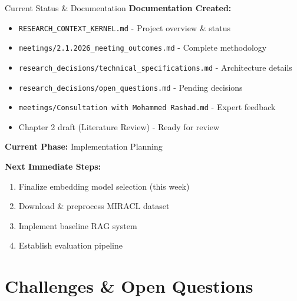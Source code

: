 \documentclass[aspectratio=169]{beamer}
\begin{document}
\begin{frame}{Current Status \& Documentation}
\textbf{Documentation Created:}
\begin{itemize}
    \item \texttt{RESEARCH\_CONTEXT\_KERNEL.md} - Project overview \& status
    \item \texttt{meetings/2.1.2026\_meeting\_outcomes.md} - Complete methodology
    \item \texttt{research\_decisions/technical\_specifications.md} - Architecture details
    \item \texttt{research\_decisions/open\_questions.md} - Pending decisions
    \item \texttt{meetings/Consultation with Mohammed Rashad.md} - Expert feedback
    \item Chapter 2 draft (Literature Review) - Ready for review
\end{itemize}

\vspace{0.3cm}

\textbf{Current Phase:} Implementation Planning

\vspace{0.3cm}

\textbf{Next Immediate Steps:}
\begin{enumerate}
    \item Finalize embedding model selection (this week)
    \item Download \& preprocess MIRACL dataset
    \item Implement baseline RAG system
    \item Establish evaluation pipeline
\end{enumerate}
\end{frame}

\section{Challenges \& Open Questions}
\end{document}
